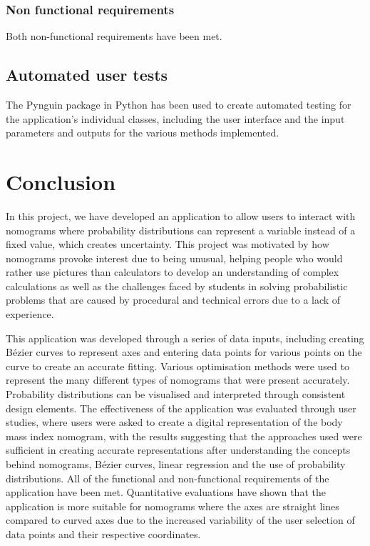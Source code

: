 \documentclass{l4proj}
\begin{document}
\subsection{Non functional requirements}
Both non-functional requirements have been met. 
\section{Automated user tests}
The Pynguin package in Python has been used to create automated testing for the application's individual classes, including the user interface and the input parameters and outputs for the various methods implemented. 

\chapter{Conclusion}\label{conclusion}
In this project, we have developed an application to allow users to interact with nomograms where probability distributions can represent a variable instead of a fixed value, which creates uncertainty. This project was motivated by how nomograms provoke interest due to being unusual, helping people who would rather use pictures than calculators to develop an understanding of complex calculations as well as the challenges faced by students in solving probabilistic problems that are caused by procedural and technical errors due to a lack of experience. 

This application was developed through a series of data inputs, including creating Bézier curves to represent axes and entering data points for various points on the curve to create an accurate fitting.  Various optimisation methods were used to represent the many different types of nomograms that were present accurately. Probability distributions can be visualised and interpreted through consistent design elements. The effectiveness of the application was evaluated through user studies, where users were asked to create a digital representation of the body mass index nomogram, with the results suggesting that the approaches used were sufficient in creating accurate representations after understanding the concepts behind nomograms, Bézier curves, linear regression and the use of probability distributions. All of the functional and non-functional requirements of the application have been met. Quantitative evaluations have shown that the application is more suitable for nomograms where the axes are straight lines compared to curved axes due to the increased variability of the user selection of data points and their respective coordinates. 
\end{document}
